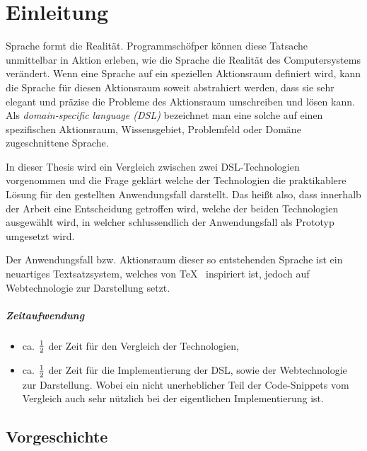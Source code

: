 \chapter{Einleitung}


Sprache formt die Realität. Programmschöfper können diese Tatsache unmittelbar
in Aktion erleben, wie die Sprache die Realität des Computersystems verändert.
Wenn eine Sprache auf ein speziellen Aktionsraum definiert wird, kann die
Sprache für diesen Aktionsraum soweit abstrahiert werden, dass sie sehr
elegant und präzise die Probleme des Aktionsraum umschreiben und lösen kann.
Als \emph{domain-specific language (DSL)} bezeichnet man eine solche auf
einen spezifischen Aktionsraum, Wissensgebiet, Problemfeld oder Domäne
zugeschnittene Sprache.

In dieser Thesis wird ein Vergleich zwischen zwei DSL-Technologien vorgenommen
und die Frage geklärt welche der Technologien die praktikablere Lösung für
den gestellten Anwendungsfall darstellt.
Das heißt also, dass innerhalb der Arbeit eine Entscheidung getroffen wird,
welche der beiden Technologien ausgewählt wird, in welcher schlussendlich der
Anwendungsfall als Prototyp umgesetzt wird.

Der Anwendungsfall bzw. Aktionsraum dieser so entstehenden Sprache ist ein
neuartiges Textsatzsystem, welches von \TeX~ inspiriert ist, jedoch auf
Webtechnologie zur Darstellung setzt.

\paragraph{Zeitaufwendung}

\begin{itemize}
  \item ca. $1\over{2}$ der Zeit für den Vergleich der Technologien,
  \item ca. $1\over{2}$ der Zeit für die Implementierung der DSL, sowie
        der Webtechnologie zur Darstellung.
        Wobei ein nicht unerheblicher Teil der Code-Snippets vom Vergleich
        auch sehr nützlich bei der eigentlichen Implementierung ist.
\end{itemize}

\section{Vorgeschichte}

